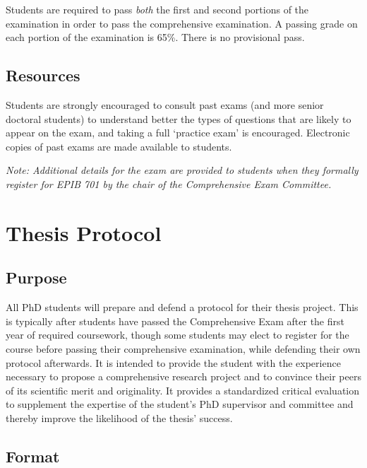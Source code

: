 \documentclass[
  openany]{book}
\begin{document}
Students are required to pass \emph{both} the first and second portions of the examination in order to pass the comprehensive examination. A passing grade on each portion of the examination is 65\%. There is no provisional pass.

\hypertarget{resources}{%
\section{Resources}\label{resources}}

Students are strongly encouraged to consult past exams (and more senior doctoral students) to understand better the types of questions that are likely to appear on the exam, and taking a full `practice exam' is encouraged. Electronic copies of past exams are made available to students.

\emph{Note: Additional details for the exam are provided to students when they formally register for EPIB 701 by the chair of the Comprehensive Exam Committee.}

\hypertarget{thesis-protocol}{%
\chapter{Thesis Protocol}\label{thesis-protocol}}

\hypertarget{purpose-1}{%
\section{Purpose}\label{purpose-1}}

All PhD students will prepare and defend a protocol for their thesis project. This is typically after students have passed the Comprehensive Exam after the first year of required coursework, though some students may elect to register for the course before passing their comprehensive examination, while defending their own protocol afterwards. It is intended to provide the student with the experience necessary to propose a comprehensive research project and to convince their peers of its scientific merit and originality. It provides a standardized critical evaluation to supplement the expertise of the student's PhD supervisor and committee and thereby improve the likelihood of the thesis' success.

\hypertarget{format}{%
\section{Format}\label{format}}
\end{document}
